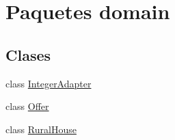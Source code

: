 \hypertarget{namespacedomain}{}\section{Paquetes domain}
\label{namespacedomain}
\subsection*{Clases}
\begin{DoxyCompactItemize}
\item 
class \mbox{\hyperlink{classdomain_1_1_integer_adapter}{Integer\+Adapter}}
\item 
class \mbox{\hyperlink{classdomain_1_1_offer}{Offer}}
\item 
class \mbox{\hyperlink{classdomain_1_1_rural_house}{Rural\+House}}
\end{DoxyCompactItemize}
